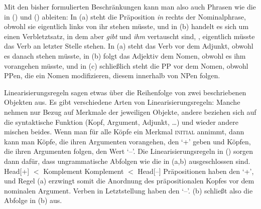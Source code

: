 Mit den bisher formulierten Beschränkungen kann man also auch Phrasen wie die in () und () ableiten:
\eal
{}
\zl
In (a) steht die Präposition \emph{in} rechts der Nominalphrase, obwohl sie eigentlich links von
ihr stehen müsste, und in (b) handelt es sich um einen Verbletztsatz, in dem aber \emph{gibt} und \emph{ihm}
vertauscht sind, \dash, eigentlich müsste das Verb an letzter Stelle stehen. In (a) steht das Verb vor
dem Adjunkt, obwohl es danach stehen müsste, in (b) folgt das Adjektiv dem Nomen,
obwohl es ihm vorangehen müsste, und in (c) schließlich steht die PP vor dem Nomen, obwohl
PPen, die ein Nomen modifizieren, diesem innerhalb von NPen folgen.

Linearisierungsregeln sagen etwas über die Reihenfolge von zwei beschriebenen Objekten aus.
Es gibt verschiedene Arten von Linearisierungsregeln: Manche nehmen nur Bezug auf Merkmale der jeweiligen
Objekte, andere beziehen sich auf die syntaktische Funktion (Kopf, Argument, Adjunkt, \ldots) und
wieder andere mischen beides.
Wenn man für alle Köpfe ein Merkmal \textsc{initial} annimmt, dann kann man Köpfe,
die ihren Argumenten vorangehen, den \initialw `+' geben und Köpfen, die ihren Argumenten folgen,
den Wert `--'. Die Linearisierungsregeln in () sorgen dann dafür, dass ungrammatische
Abfolgen wie die in (a,b) ausgeschlossen sind.
\eal
\ex\label{lp-ini-Komplement} Head[\initial+] $<$ Komplement
\ex Komplement $<$ Head[\initial --]
\zl
Präpositionen haben den \initialw `+', und Regel (a) erzwingt somit die Anordnung des präpositionalen
Kopfes vor dem nominalen Argument. Verben in Letztstellung haben den \initialw `--'. (b) schließt
also die Abfolge in (b) aus.

